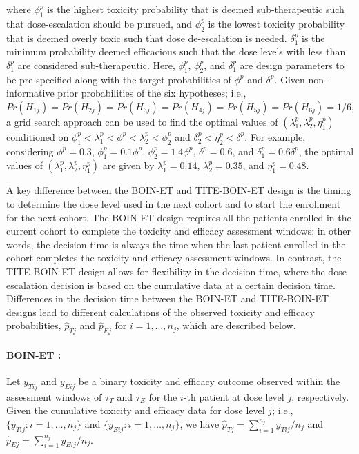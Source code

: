 where $\phi^p_1$ is the highest toxicity probability that is deemed sub-therapeutic such that dose-escalation should be pursued, and $\phi^p_2$ is the lowest toxicity probability that is deemed overly toxic such that dose de-escalation is needed. $\delta^p_1$ is the minimum probability deemed efficacious such that the dose levels with less than $\delta^p_1$ are considered sub-therapeutic. Here, $\phi^p_1$, $\phi^p_2$, and $\delta^p_1$ are design parameters to be pre-specified along with the target probabilities of $\phi^p$ and $\delta^p$. Given non-informative prior probabilities of the six hypotheses; i.e., $Pr(H_{1j})=Pr(H_{2j})=Pr(H_{3j})=Pr(H_{4j})=Pr(H_{5j})=Pr(H_{6j})=1/6$, a grid search approach can be used to find the optimal values of $(\lambda^p_1,\lambda^p_2,\eta^p_1)$ conditioned on $\phi^p_1<\lambda^p_1<\phi^p<\lambda^p_2<\phi^p_2$ and $\delta^p_2<\eta^p_2<\delta^p$. For example, considering $\phi^p=0.3$, $\phi^p_1=0.1\phi^p$, $\phi^p_2=1.4\phi^p$, $\delta^p=0.6$, and $\delta^p_1=0.6\delta^p$, the optimal values of $(\lambda^p_1,\lambda^p_2,\eta^p_1)$ are given by $\lambda^p_1=0.14$, $\lambda^p_2=0.35$, and $\eta^p_1=0.48$.

A key difference between the BOIN-ET and TITE-BOIN-ET design is the timing to determine the dose level used in the next cohort and to start the enrollment for the next cohort. The BOIN-ET design requires all the patients enrolled in the current cohort to complete the toxicity and efficacy assessment windows; in other words, the decision time is always the time when the last patient enrolled in the cohort completes the toxicity and efficacy assessment windows. In contrast, the TITE-BOIN-ET design allows for flexibility in the decision time, where the dose escalation decision is based on the cumulative data at a certain decision time. Differences in the decision time between the BOIN-ET and TITE-BOIN-ET designs lead to different calculations of the observed toxicity and efficacy probabilities, $\hat{p}_{Tj}$ and $\hat{p}_{Ej}$ for $i=1,\ldots,n_j$, which are described below.

\paragraph{BOIN-ET \citep{takeda:2018}:} Let $y_{Tij}$ and $y_{Eij}$ be a binary toxicity and efficacy outcome observed within the assessment windows of $\tau_T$ and $\tau_E$ for the $i$-th patient at dose level $j$, respectively. Given the cumulative toxicity and efficacy data for dose level $j$; i.e., $\{y_{Tij}:i=1,\ldots,n_j\}$ and $\{y_{Eij}:i=1,\ldots,n_j\}$, we have $\hat{p}_{Tj}=\sum_{i=1}^{n_j}y_{Tij}/n_j$ and $\hat{p}_{Ej}=\sum_{i=1}^{n_j}y_{Eij}/n_j$.

